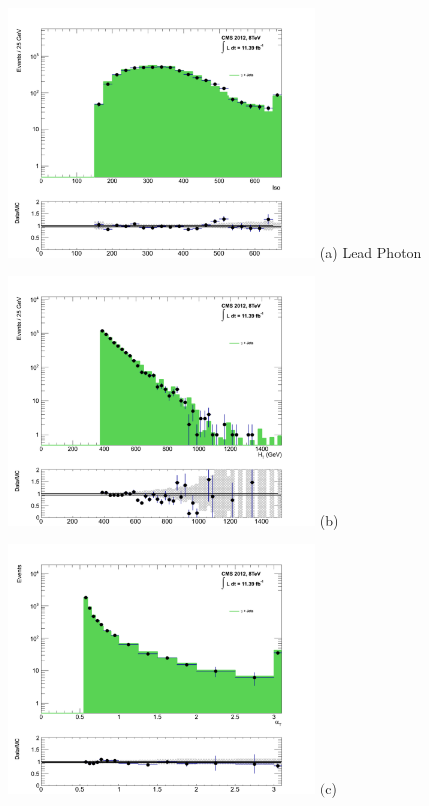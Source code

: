 \begin{itemize}
\begin{minipage}{\linewidth}
\centering
\begin{minipage}{.48\textwidth}
\centering
\includegraphics[width = 3.2in]{plots/photon_leadphoton_datamc.pdf}
(a) Lead Photon \pt
\end{minipage}
\begin{minipage}{.48\textwidth}
\centering
\includegraphics[width = 3.2in]{plots/photon_ht_datamc.pdf}
(b) \theht
\end{minipage}
\begin{minipage}{.48\textwidth}
\centering
\includegraphics[width = 3.2in]{plots/photon_alphat_datamc.pdf}
$\text{(c}$) \alphat

\end{minipage}
\end{minipage}
\end{itemize}
